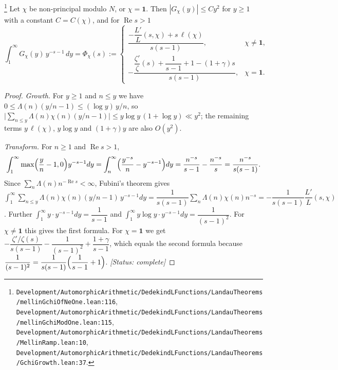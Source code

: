 \begin{lemma}\label{lem:E-mellin}
\footnote{\nolinkurl{Development/AutomorphicArithmetic/DedekindLFunctions/LandauTheorems/mellinGchiOfNeOne.lean:116}, \nolinkurl{Development/AutomorphicArithmetic/DedekindLFunctions/LandauTheorems/mellinGchiModOne.lean:115}, \nolinkurl{Development/AutomorphicArithmetic/DedekindLFunctions/LandauTheorems/MellinRamp.lean:10}, \nolinkurl{Development/AutomorphicArithmetic/DedekindLFunctions/LandauTheorems/GchiGrowth.lean:37}.}%
Let $\chi$ be non-principal modulo $N$, or $\chi=\mathbf 1$. Then $|G_\chi(y)|\le Cy^{2}$ for
$y\ge1$ with a constant $C=C(\chi)$, and for $\operatorname{Re}s>1$
\[
\int_1^\infty G_\chi(y)\,y^{-s-1}\,dy=\Phi_\chi(s):=
\begin{cases}
\dfrac{-\dfrac{L'}{L}(s,\chi)+s\,\ell(\chi)}{s(s-1)}, & \chi\neq\mathbf 1,\\[3ex]
-\dfrac{\dfrac{\zeta'}{\zeta}(s)+\dfrac1{s-1}+1-(1+\gamma)s}{s(s-1)}, & \chi=\mathbf 1 .
\end{cases}
\]
\end{lemma}
\begin{proof}
\emph{Growth.} For $y\ge1$ and $n\le y$ we have $0\le\Lambda(n)(y/n-1)\le(\log y)\,y/n$, so
$\bigl|\sum_{n\le y}\Lambda(n)\chi(n)(y/n-1)\bigr|\le y\log y\,(1+\log y)\ll y^{2}$; the remaining
terms $y\,\ell(\chi)$, $y\log y$ and $(1+\gamma)y$ are also $O(y^{2})$.

\emph{Transform.} For $n\ge1$ and $\operatorname{Re}s>1$,
\[
\int_1^\infty\max\Bigl(\frac yn-1,0\Bigr)y^{-s-1}dy=\int_n^\infty\Bigl(\frac{y^{-s}}{n}-y^{-s-1}\Bigr)dy
=\frac{n^{-s}}{s-1}-\frac{n^{-s}}{s}=\frac{n^{-s}}{s(s-1)} .
\]
Since $\sum_n\Lambda(n)n^{-\operatorname{Re}s}<\infty$, Fubini's theorem gives
$\int_1^\infty\sum_{n\le y}\Lambda(n)\chi(n)(y/n-1)\,y^{-s-1}dy=
\dfrac{1}{s(s-1)}\sum_n\Lambda(n)\chi(n)n^{-s}=-\dfrac{1}{s(s-1)}\dfrac{L'}{L}(s,\chi)$. Further
$\int_1^\infty y\cdot y^{-s-1}dy=\dfrac1{s-1}$ and
$\int_1^\infty y\log y\cdot y^{-s-1}dy=\dfrac1{(s-1)^{2}}$. For $\chi\neq\mathbf1$ this gives the
first formula. For $\chi=\mathbf 1$ we get
$-\dfrac{\zeta'/\zeta(s)}{s(s-1)}-\dfrac{1}{(s-1)^{2}}+\dfrac{1+\gamma}{s-1}$, which equals the
second formula because $\dfrac1{(s-1)^{2}}=\dfrac{1}{s(s-1)}\Bigl(\dfrac1{s-1}+1\Bigr)$.
\textit{[Status: complete]}
\end{proof}

